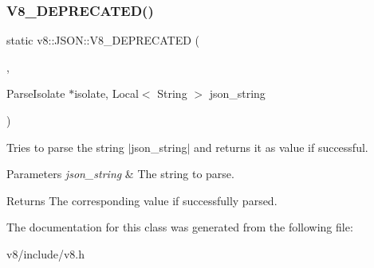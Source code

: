 \subsubsection{\texorpdfstring{V8\+\_\+\+D\+E\+P\+R\+E\+C\+A\+T\+E\+D()}{V8\_DEPRECATED()}}
{\footnotesize\ttfamily static v8\+::\+J\+S\+O\+N\+::\+V8\+\_\+\+D\+E\+P\+R\+E\+C\+A\+T\+ED (\begin{DoxyParamCaption}\item[{\char`\"{}Use the maybe version taking context\char`\"{}}]{,  }\item[{\mbox{\hyperlink{classv8_1_1MaybeLocal}{Maybe\+Local}}$<$ \mbox{\hyperlink{classv8_1_1Value}{Value}} $>$ }]{ParseIsolate $\ast$isolate, Local$<$ String $>$ json\+\_\+string }\end{DoxyParamCaption})\hspace{0.3cm}{\ttfamily [static]}}

Tries to parse the string $\vert$json\+\_\+string$\vert$ and returns it as value if successful.


\begin{DoxyParams}{Parameters}
{\em json\+\_\+string} & The string to parse. \\
\hline
\end{DoxyParams}
\begin{DoxyReturn}{Returns}
The corresponding value if successfully parsed. 
\end{DoxyReturn}


The documentation for this class was generated from the following file\+:\begin{DoxyCompactItemize}
\item 
v8/include/v8.\+h\end{DoxyCompactItemize}
